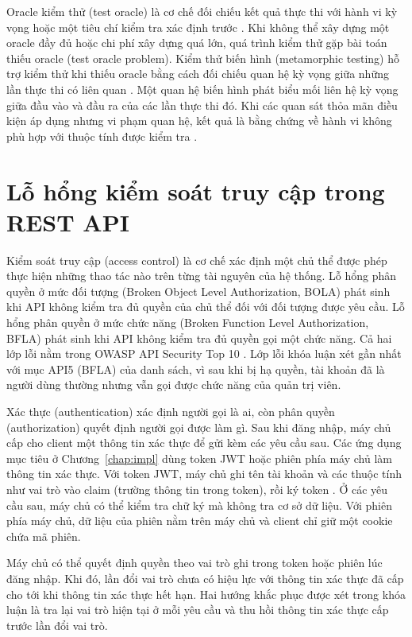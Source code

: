 Oracle kiểm thử (test oracle) là cơ chế đối chiếu kết quả thực thi với hành vi kỳ vọng hoặc một tiêu chí kiểm tra xác định trước \cite{barr2015oracle}. Khi không thể xây dựng một oracle đầy đủ hoặc chi phí xây dựng quá lớn, quá trình kiểm thử gặp bài toán thiếu oracle (test oracle problem).
Kiểm thử biến hình (metamorphic testing) hỗ trợ kiểm thử khi thiếu oracle bằng cách đối chiếu quan hệ kỳ vọng giữa những lần thực thi có liên quan \cite{chen1998metamorphic}. Một quan hệ biến hình phát biểu mối liên hệ kỳ vọng giữa đầu vào và đầu ra của các lần thực thi đó. Khi các quan sát thỏa mãn điều kiện áp dụng nhưng vi phạm quan hệ, kết quả là bằng chứng về hành vi không phù hợp với thuộc tính được kiểm tra \cite{chen2018metamorphic}.

\section{Lỗ hổng kiểm soát truy cập trong REST API}
\label{sec:bg_access_control}

Kiểm soát truy cập (access control) là cơ chế xác định một chủ thể được phép thực hiện những thao tác nào trên từng tài nguyên của hệ thống. Lỗ hổng phân quyền ở mức đối tượng (Broken Object Level Authorization, BOLA) phát sinh khi API không kiểm tra đủ quyền của chủ thể đối với đối tượng được yêu cầu. Lỗ hổng phân quyền ở mức chức năng (Broken Function Level Authorization, BFLA) phát sinh khi API không kiểm tra đủ quyền gọi một chức năng. Cả hai lớp lỗi nằm trong OWASP API Security Top 10 \cite{owasp2023api}. Lớp lỗi khóa luận xét gần nhất với mục API5 (BFLA) của danh sách, vì sau khi bị hạ quyền, tài khoản đã là người dùng thường nhưng vẫn gọi được chức năng của quản trị viên.

Xác thực (authentication) xác định người gọi là ai, còn phân quyền (authorization) quyết định người gọi được làm gì. Sau khi đăng nhập, máy chủ cấp cho client một thông tin xác thực để gửi kèm các yêu cầu sau. Các ứng dụng mục tiêu ở Chương~\ref{chap:impl} dùng token JWT hoặc phiên phía máy chủ làm thông tin xác thực. Với token JWT, máy chủ ghi tên tài khoản và các thuộc tính như vai trò vào claim (trường thông tin trong token), rồi ký token \cite{rfc7519}. Ở các yêu cầu sau, máy chủ có thể kiểm tra chữ ký mà không tra cơ sở dữ liệu. Với phiên phía máy chủ, dữ liệu của phiên nằm trên máy chủ và client chỉ giữ một cookie chứa mã phiên.

Máy chủ có thể quyết định quyền theo vai trò ghi trong token hoặc phiên lúc đăng nhập. Khi đó, lần đổi vai trò chưa có hiệu lực với thông tin xác thực đã cấp cho tới khi thông tin xác thực hết hạn. Hai hướng khắc phục được xét trong khóa luận là tra lại vai trò hiện tại ở mỗi yêu cầu và thu hồi thông tin xác thực cấp trước lần đổi vai trò.

